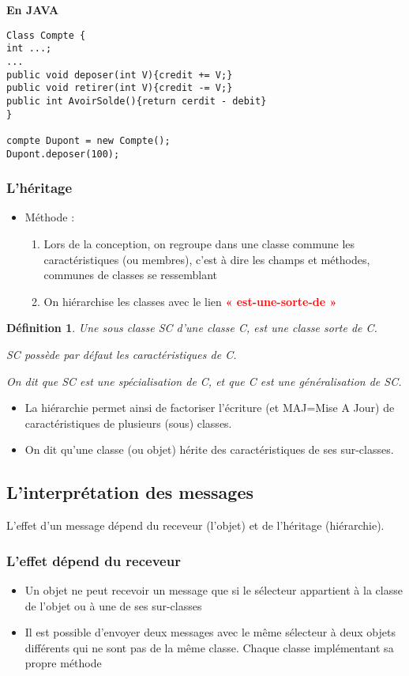 \documentclass{article}
\newtheorem{definition}{Définition}
\begin{document}
\textbf{En JAVA} 

\begin{verbatim}
Class Compte {
int ...;
...
public void deposer(int V){credit += V;}
public void retirer(int V){credit -= V;}
public int AvoirSolde(){return cerdit - debit}
}

compte Dupont = new Compte();
Dupont.deposer(100);
\end{verbatim}

\subsubsection{L'héritage}

\begin{itemize}
	\item Méthode :
		\begin{enumerate}
			\item Lors de la conception, on regroupe dans une classe commune les
				caractéristiques (ou membres), c’est à dire les champs et méthodes,
				communes de classes se ressemblant
			\item On hiérarchise les classes avec le lien 
				\textcolor{red}{\textbf{« est-une-sorte-de »}}
		\end{enumerate}
\end{itemize}

\begin{definition}
	Une sous classe SC d'une classe C, est une classe sorte de C.

	SC possède par défaut les caractéristiques de C.

	On dit que SC est une spécialisation de C, et que C est une
	généralisation de SC.
\end{definition}

\begin{itemize}
	\item La hiérarchie permet ainsi de factoriser l'écriture (et MAJ=Mise A Jour) 
		de caractéristiques de plusieurs (sous) classes.
	\item On dit qu'une classe (ou objet) hérite des caractéristiques 
		de ses sur-classes.
\end{itemize}

\subsection{L'interprétation des messages}
L’effet d’un message dépend du receveur (l'objet) et de
l'héritage (hiérarchie).

\subsubsection{L'effet dépend du receveur}
\begin{itemize}
	\item Un objet ne peut recevoir un message que si le sélecteur
appartient à la classe de l'objet ou à une de ses sur-classes
	\item  Il est possible d'envoyer deux messages avec le même sélecteur
à deux objets différents qui ne sont pas de la même classe.
Chaque classe implémentant sa propre méthode
\end{itemize}
\end{document}
